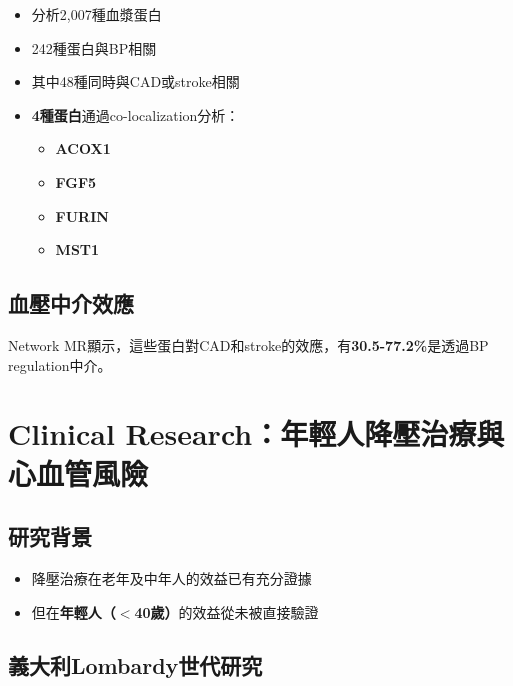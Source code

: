 \documentclass[12pt,a4paper]{article}
\begin{document}
\begin{itemize}
    \item 分析2,007種血漿蛋白
    \item 242種蛋白與BP相關
    \item 其中48種同時與CAD或stroke相關
    \item \textbf{4種蛋白}通過co-localization分析：
    \begin{itemize}
        \item \textbf{ACOX1}
        \item \textbf{FGF5}
        \item \textbf{FURIN}
        \item \textbf{MST1}
    \end{itemize}
\end{itemize}

\subsection{血壓中介效應}

Network MR顯示，這些蛋白對CAD和stroke的效應，有\textbf{30.5-77.2\%}是透過BP regulation中介。


\section{Clinical Research：年輕人降壓治療與心血管風險}

\subsection{研究背景}

\begin{itemize}
    \item 降壓治療在老年及中年人的效益已有充分證據
    \item 但在\textbf{年輕人（$<$40歲）}的效益從未被直接驗證
\end{itemize}

\subsection{義大利Lombardy世代研究}
\end{document}
